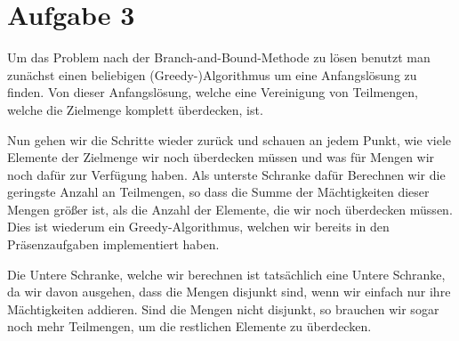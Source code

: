\documentclass{article}
\begin{document}
\section*{Aufgabe 3}

Um das Problem nach der Branch-and-Bound-Methode zu lösen benutzt man zunächst
einen beliebigen (Greedy-)Algorithmus um eine Anfangslösung zu finden. Von
dieser Anfangslösung, welche eine Vereinigung von Teilmengen, welche die
Zielmenge komplett überdecken, ist.

Nun gehen wir die Schritte wieder zurück und schauen an jedem Punkt, wie viele
Elemente der Zielmenge wir noch überdecken müssen und was für Mengen wir noch
dafür zur Verfügung haben. Als unterste Schranke dafür Berechnen wir die
geringste Anzahl an Teilmengen, so dass die Summe der Mächtigkeiten dieser
Mengen größer ist, als die Anzahl der Elemente, die wir noch überdecken müssen.
Dies ist wiederum ein Greedy-Algorithmus, welchen wir bereits in den
Präsenzaufgaben implementiert haben.

Die Untere Schranke, welche wir berechnen ist tatsächlich eine Untere Schranke,
da wir davon ausgehen, dass die Mengen disjunkt sind, wenn wir einfach nur ihre
Mächtigkeiten addieren. Sind die Mengen nicht disjunkt, so brauchen wir sogar
noch mehr Teilmengen, um die restlichen Elemente zu überdecken.
\end{document}
